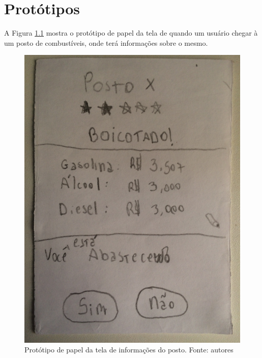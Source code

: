 \chapter{Protótipos}
\label{chap:prototipo}

A Figura \ref{img:prototipo_de_papel_info_posto} mostra o protótipo de papel da tela de quando um usuário chegar à um posto de combustíveis, onde terá informações sobre o mesmo.
\begin{figure}[H]
    \centering
    \includegraphics[scale=0.1, angle=-90]{figuras/prototipo_papel_info_posto.jpg}
    \caption[Protótipo de papel da tela de informações do posto]{Protótipo de papel da tela de informações do posto. Fonte: autores}
    \label{img:prototipo_de_papel_info_posto}
\end{figure}
 \pagebreak

